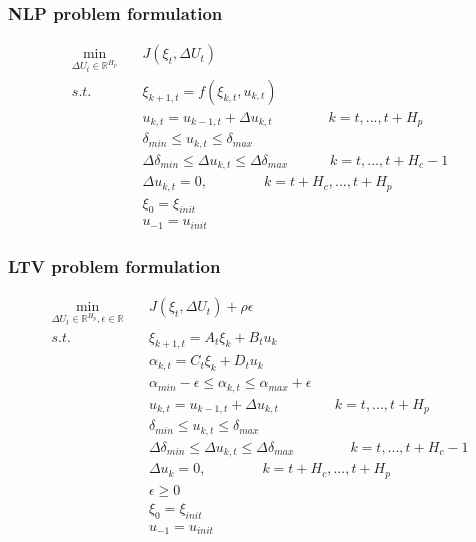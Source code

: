 \documentclass{beamer}
\begin{document}
\begin{frame}
\frametitle{NLP problem formulation}

\begin{align*}
\min_{\Delta U_t \in \mathbb{R}^{H_p}} \quad &J(\xi_t, \Delta U_t) \\
s.t. \qquad &\xi_{k+1,t} = f(\xi_{k,t}, u_{k,t}) \\
&u_{k,t} = u_{k-1,t} + \Delta {u_{k,t}} \qquad \qquad k = t, . . . , t
+ H_{p}\\
&\delta_{min} \leq u_{k,t} \leq \delta_{max} \\
&\Delta \delta_{min} \leq \Delta u_{k,t} \leq \Delta \delta_{max} \qquad \quad k = t, . . . , t + H_c
-1 \\
&\Delta u_{k,t} = 0, \qquad \qquad k = t + H_c, . . . , t + H_p \\
&\xi_0 = \xi_{init} \\
& u_{-1} = u_{init}
\end{align*}

\end{frame}







\begin{frame}
\frametitle{LTV problem formulation }

\begin{align*}
\min_{\Delta U_t \in \mathbb{R}^{H_p}, \epsilon \in \mathbb{R}} \quad &J(\xi_t, \Delta U_t) +
\rho \epsilon \\
s.t. \qquad &\xi_{k+1,t} = A_t \xi_k + B_t u_k \\
&\alpha_{k,t} = C_t \xi_k + D_t u_k \\
&\alpha_{min} - \epsilon \leq \alpha_{k,t} \leq \alpha_{max} + \epsilon \\
&u_{k,t} = u_{k-1,t} + \Delta u_{k,t} \qquad \qquad k = t, . . . , t + H_p \\
&\delta_{min} \leq u_{k,t} \leq \delta_{max} \\ 
&\Delta \delta_{min} \leq \Delta u_{k,t} \leq \Delta \delta_{max} \qquad \qquad k = t, . . ., t + H_c - 1 \\
&\Delta u_k = 0, \qquad \qquad k = t + H_c, . . . , t + H_p \\
&\epsilon \geq 0 \\
&\xi_0 = \xi_{init} \\
& u_{-1} = u_{init}
\end{align*}

\end{frame}
\end{document}
